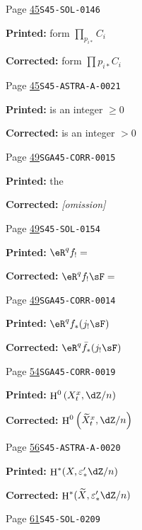 \documentclass[oneside]{book}
\DeclareMathOperator{\h}{H}
\theoremstyle{sga-source}
\theoremstyle{sga-source-dash}
\theoremstyle{sga-source-dotdash}
\theoremstyle{sga-source-number-note-dash}
\theoremstyle{sga-source-note-number-dotdash}
\theoremstyle{sga-source-example-dotdash}
\theoremstyle{sga-source-inline-number}
\theoremstyle{sga-source-bare-number}
\theoremstyle{sga-source}
\begin{document}
\begin{description}
\smallskip
\item[\hypertarget{apparatus:EN-0014}{14}] Page \hyperlink{printpage:en:45}{45}\quad\texttt{S45-SOL-0146}
\par\noindent\textbf{Printed:} form $\prod_{p_{i*}}C_i$
\par\noindent\textbf{Corrected:} form $\prod p_{i*}C_i$
\smallskip
\item[\hypertarget{apparatus:EN-0015}{15}] Page \hyperlink{printpage:en:45}{45}\quad\texttt{S45-ASTRA-A-0021}
\par\noindent\textbf{Printed:} is an integer $\geqslant0$
\par\noindent\textbf{Corrected:} is an integer $>0$
\smallskip
\item[\hypertarget{apparatus:EN-0016}{16}] Page \hyperlink{printpage:en:49}{49}\quad\texttt{SGA45-CORR-0015}
\par\noindent\textbf{Printed:} the 
\par\noindent\textbf{Corrected:} \emph{\textnormal{[omission]}}
\smallskip
\item[\hypertarget{apparatus:EN-0017}{17}] Page \hyperlink{printpage:en:49}{49}\quad\texttt{S45-SOL-0154}
\par\noindent\textbf{Printed:} \(\eR^q f_! =\)
\par\noindent\textbf{Corrected:} \(\eR^q f_! \sF =\)
\smallskip
\item[\hypertarget{apparatus:EN-0018}{18}] Page \hyperlink{printpage:en:49}{49}\quad\texttt{SGA45-CORR-0014}
\par\noindent\textbf{Printed:} \(\eR^q f_*(j_! \sF)\)
\par\noindent\textbf{Corrected:} \(\eR^q \bar f_*(j_! \sF)\)
\smallskip
\item[\hypertarget{apparatus:EN-0019}{19}] Page \hyperlink{printpage:en:54}{54}\quad\texttt{SGA45-CORR-0019}
\par\noindent\textbf{Printed:} \(\h^0\left(X_t^x,\dZ/n\right)\)
\par\noindent\textbf{Corrected:} \(\h^0\left(\widetilde X_t^x,\dZ/n\right)\)
\smallskip
\item[\hypertarget{apparatus:EN-0020}{20}] Page \hyperlink{printpage:en:56}{56}\quad\texttt{S45-ASTRA-A-0020}
\par\noindent\textbf{Printed:} \(\h^*(X,\varepsilon_*' \dZ/n)\)
\par\noindent\textbf{Corrected:} \(\h^*(\widetilde X,\varepsilon_*' \dZ/n)\)
\smallskip
\item[\hypertarget{apparatus:EN-0021}{21}] Page \hyperlink{printpage:en:61}{61}\quad\texttt{S45-SOL-0209}

\end{description}
\end{document}
